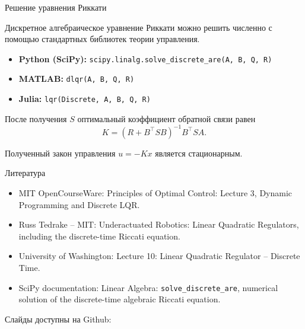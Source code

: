 \documentclass{beamer}
\newcommand{\myqrframe}{
	\begin{frame}
		\begin{center}
			\centerline{Слайды доступны на Github:}
			\bigskip
			\centerline{\mygit}
			\bigskip
			\myqr
		\end{center}
	\end{frame}
}
\begin{document}
	\begin{frame}{Решение уравнения Риккати}
		\begin{flushleft}
			
			Дискретное алгебраическое уравнение Риккати можно
			решить численно с помощью стандартных библиотек теории управления.
			
			\medskip
			
			\begin{itemize}
				\item \textbf{Python (SciPy):}
				\texttt{scipy.linalg.solve\_discrete\_are(A, B, Q, R)}
				
				\medskip
				
				\item \textbf{MATLAB:}
				\texttt{dlqr(A, B, Q, R)}
				
				\medskip
				
				\item \textbf{Julia:}
				\texttt{lqr(Discrete, A, B, Q, R)}
			\end{itemize}
			
			\medskip
			
			После получения $S$ оптимальный коэффициент обратной связи равен
			\[
			K=(R+B^\top SB)^{-1}B^\top SA.
			\]
			
			Полученный закон управления $u=-Kx$ является стационарным.
			
		\end{flushleft}
	\end{frame}

\begin{frame}{Литература}
	\begin{itemize}
		
		\item MIT OpenCourseWare:
		{Principles of Optimal Control: Lecture 3, Dynamic Programming and Discrete LQR.}
		
		\item Russ Tedrake -- MIT:
		{Underactuated Robotics: Linear Quadratic Regulators, including the discrete-time Riccati equation.}
		
		\item University of Washington:
		{Lecture 10: Linear Quadratic Regulator -- Discrete Time.}
		
		\item SciPy documentation:
		{Linear Algebra: \texttt{solve\_discrete\_are}, numerical solution of the discrete-time algebraic Riccati equation.}
		
	\end{itemize}
\end{frame}





\myqrframe
\end{document}
